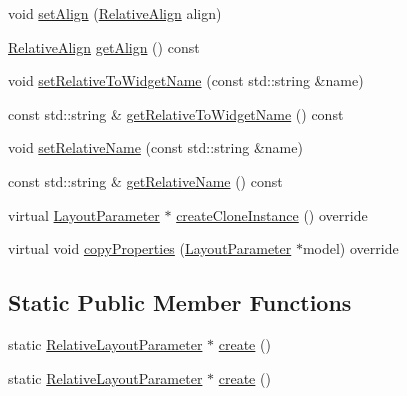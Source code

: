 \begin{DoxyCompactItemize}
\item 
void \hyperlink{classui_1_1RelativeLayoutParameter_a5eadca3a1cac5c1b87d493945281696a}{set\+Align} (\hyperlink{classui_1_1RelativeLayoutParameter_a40283d09524c58e61741de3288e6769d}{Relative\+Align} align)
\item 
\hyperlink{classui_1_1RelativeLayoutParameter_a40283d09524c58e61741de3288e6769d}{Relative\+Align} \hyperlink{classui_1_1RelativeLayoutParameter_a1b2a2308ca06248641853062be1cb55b}{get\+Align} () const
\item 
void \hyperlink{classui_1_1RelativeLayoutParameter_aa1ba720efd1054c7dfedca47dfb26975}{set\+Relative\+To\+Widget\+Name} (const std\+::string \&name)
\item 
const std\+::string \& \hyperlink{classui_1_1RelativeLayoutParameter_a5519af0b68eb3cf47febaa910c7aa57e}{get\+Relative\+To\+Widget\+Name} () const
\item 
void \hyperlink{classui_1_1RelativeLayoutParameter_a08d5be0738e5aa06c95d4ecf20b87b5f}{set\+Relative\+Name} (const std\+::string \&name)
\item 
const std\+::string \& \hyperlink{classui_1_1RelativeLayoutParameter_a4e83789fab96a1c78211e15887e41a6e}{get\+Relative\+Name} () const
\item 
virtual \hyperlink{classui_1_1LayoutParameter}{Layout\+Parameter} $\ast$ \hyperlink{classui_1_1RelativeLayoutParameter_ad3da385d6428bced2722a6308ce685f4}{create\+Clone\+Instance} () override
\item 
virtual void \hyperlink{classui_1_1RelativeLayoutParameter_a370cb1f399839e47fcc471d8dfc7fffc}{copy\+Properties} (\hyperlink{classui_1_1LayoutParameter}{Layout\+Parameter} $\ast$model) override
\end{DoxyCompactItemize}
\subsection*{Static Public Member Functions}
\begin{DoxyCompactItemize}
\item 
static \hyperlink{classui_1_1RelativeLayoutParameter}{Relative\+Layout\+Parameter} $\ast$ \hyperlink{classui_1_1RelativeLayoutParameter_a6202a08e1d8315adba9ea01c5dd22de0}{create} ()
\item 
static \hyperlink{classui_1_1RelativeLayoutParameter}{Relative\+Layout\+Parameter} $\ast$ \hyperlink{classui_1_1RelativeLayoutParameter_ae9b1b854947632ce43085f68451c793a}{create} ()
\end{DoxyCompactItemize}
